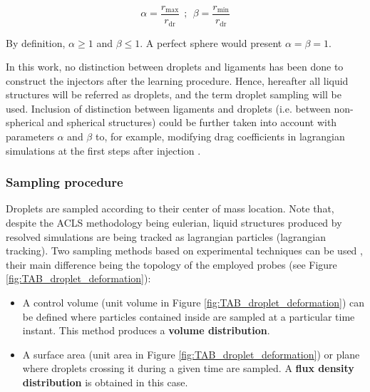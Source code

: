 \begin{equation}
\alpha = \frac{r_\mathrm{max}}{r_\mathrm{dr}} ~~ ; ~~ \beta = \frac{r_\mathrm{min}}{r_\mathrm{dr}}
\end{equation}	

By definition, $\alpha \geq 1$ and $\beta \leq 1$. A perfect sphere would present $\alpha = \beta = 1$.

In this work, no distinction between droplets and ligaments has been done to construct the injectors after the learning procedure. Hence, hereafter all liquid structures will be referred as droplets, and the term droplet sampling will be used. Inclusion of distinction between ligaments and droplets (i.e. between non-spherical and spherical structures) could be further taken into account with parameters $\alpha$ and $\beta$ to, for example, modifying drag coefficients in lagrangian simulations at the first steps after injection . 


\subsubsection*{Sampling procedure}

Droplets are sampled according to their center of mass location. Note that, despite the ACLS methodology being eulerian, liquid structures produced by resolved simulations are being tracked as lagrangian particles (lagrangian tracking). Two sampling methods based on experimental techniques can be used , their main difference being the topology of the employed probes (see Figure \ref{fig:TAB_droplet_deformation}):

\begin{itemize}

	\item A control volume (unit volume in Figure \ref{fig:TAB_droplet_deformation}) can be defined where particles contained inside are sampled at a particular time instant. This method produces a \textbf{volume distribution}. 
	
	\item A surface area (unit area in Figure \ref{fig:TAB_droplet_deformation}) or plane where droplets crossing it during a given time are sampled. A \textbf{flux density distribution} is obtained in this case.

\end{itemize}


